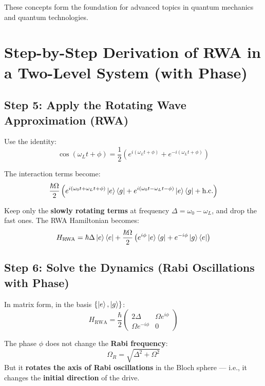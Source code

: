 These concepts form the foundation for advanced topics in quantum mechanics and quantum technologies.


















\section*{Step-by-Step Derivation of RWA in a Two-Level System (with Phase)}
\subsection*{Step 5: Apply the Rotating Wave Approximation (RWA)}

Use the identity:
\begin{equation}
\cos(\omega_L t + \phi) = \frac{1}{2}\left(e^{i(\omega_L t + \phi)} + e^{-i(\omega_L t + \phi)} \right)
\end{equation}

The interaction terms become:
\begin{equation}
\frac{\hbar\Omega}{2} \left( e^{i(\omega_0 t + \omega_L t + \phi)} \ket{e}\bra{g} + e^{i(\omega_0 t - \omega_L t - \phi)} \ket{e}\bra{g} + \text{h.c.} \right)
\end{equation}

Keep only the \textbf{slowly rotating terms} at frequency \(\Delta = \omega_0 - \omega_L\), and drop the fast ones. The RWA Hamiltonian becomes:
\begin{equation}
H_{\text{RWA}} = \hbar \Delta \ket{e}\bra{e} + \frac{\hbar \Omega}{2} \left( e^{i\phi} \ket{e}\bra{g} + e^{-i\phi} \ket{g}\bra{e} \right)
\end{equation}

\subsection*{Step 6: Solve the Dynamics (Rabi Oscillations with Phase)}

In matrix form, in the basis \(\{ \ket{e}, \ket{g} \}\):
\begin{equation}
H_{\text{RWA}} = \frac{\hbar}{2}
\begin{pmatrix}
2\Delta & \Omega e^{i\phi} \\
\Omega e^{-i\phi} & 0
\end{pmatrix}
\end{equation}

The phase \(\phi\) does not change the \textbf{Rabi frequency}:
\begin{equation}
\Omega_R = \sqrt{\Delta^2 + \Omega^2}
\end{equation}
But it \textbf{rotates the axis of Rabi oscillations} in the Bloch sphere — i.e., it changes the \textbf{initial direction} of the drive.
